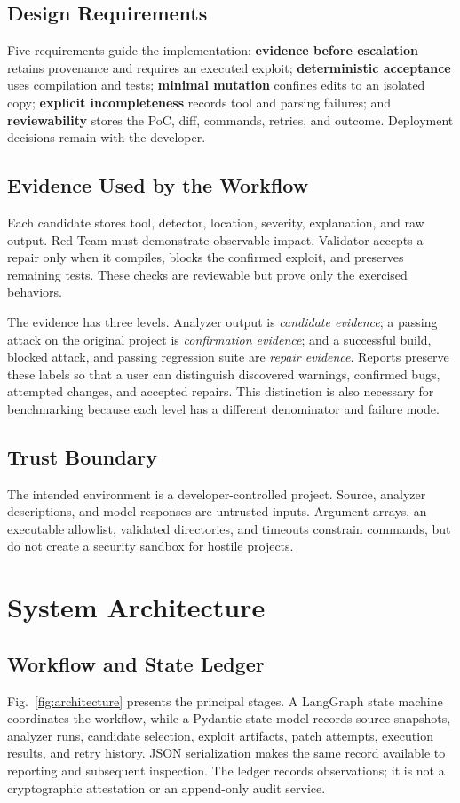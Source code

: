 \documentclass[conference,a4paper,10pt]{IEEEtran}
\begin{document}
\subsection{Design Requirements}
Five requirements guide the implementation: \textbf{evidence before escalation} retains provenance and requires an executed exploit; \textbf{deterministic acceptance} uses compilation and tests; \textbf{minimal mutation} confines edits to an isolated copy; \textbf{explicit incompleteness} records tool and parsing failures; and \textbf{reviewability} stores the PoC, diff, commands, retries, and outcome. Deployment decisions remain with the developer.

\subsection{Evidence Used by the Workflow}
Each candidate stores tool, detector, location, severity, explanation, and raw output. Red Team must demonstrate observable impact. Validator accepts a repair only when it compiles, blocks the confirmed exploit, and preserves remaining tests. These checks are reviewable but prove only the exercised behaviors.

The evidence has three levels. Analyzer output is \emph{candidate evidence}; a passing attack on the original project is \emph{confirmation evidence}; and a successful build, blocked attack, and passing regression suite are \emph{repair evidence}. Reports preserve these labels so that a user can distinguish discovered warnings, confirmed bugs, attempted changes, and accepted repairs. This distinction is also necessary for benchmarking because each level has a different denominator and failure mode.

\subsection{Trust Boundary}
The intended environment is a developer-controlled project. Source, analyzer descriptions, and model responses are untrusted inputs. Argument arrays, an executable allowlist, validated directories, and timeouts constrain commands, but do not create a security sandbox for hostile projects.

\section{System Architecture}
\subsection{Workflow and State Ledger}
Fig.~\ref{fig:architecture} presents the principal stages. A LangGraph state machine coordinates the workflow, while a Pydantic state model records source snapshots, analyzer runs, candidate selection, exploit artifacts, patch attempts, execution results, and retry history. JSON serialization makes the same record available to reporting and subsequent inspection. The ledger records observations; it is not a cryptographic attestation or an append-only audit service.
\end{document}
